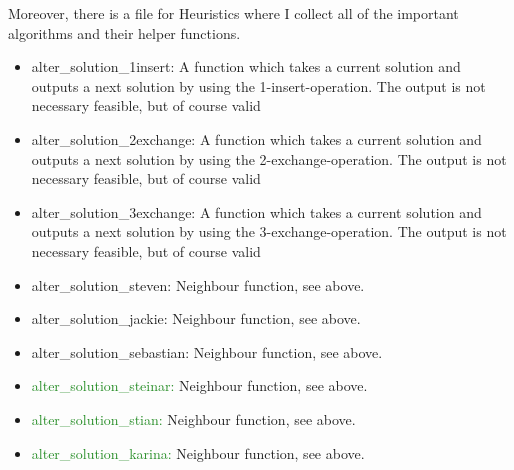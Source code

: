 \documentclass[a4paper,11pt]{article}
\theoremstyle{mytheor}
\begin{document}
\clearpage
Moreover, there is a file for Heuristics where I collect all of the important algorithms and their helper functions.
\begin{itemize}
\item alter\_solution\_1insert: A function which takes a current solution and outputs a next solution by using the 1-insert-operation. The output is not necessary feasible, but of course valid
\item alter\_solution\_2exchange: A function which takes a current solution and outputs a next solution by using the 2-exchange-operation. The output is not necessary feasible, but of course valid
\item alter\_solution\_3exchange: A function which takes a current solution and outputs a next solution by using the 3-exchange-operation. The output is not necessary feasible, but of course valid
\item alter\_solution\_steven: Neighbour function, see above.
\item alter\_solution\_jackie: Neighbour function, see above.
\item alter\_solution\_sebastian: Neighbour function, see above.
\item \textcolor{ForestGreen}{alter\_solution\_steinar: }Neighbour function, see above.
\item \textcolor{ForestGreen}{alter\_solution\_stian: }Neighbour function, see above.
\item \textcolor{ForestGreen}{alter\_solution\_karina: }Neighbour function, see above.



\end{itemize}
\end{document}
